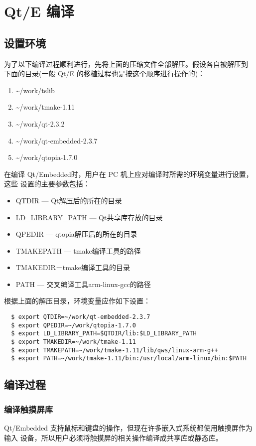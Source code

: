 \section{Qt/E 编译}
\subsection{设置环境}
为了以下编译过程顺利进行，先将上面的压缩文件全部解压。假设各自被解压到
下面的目录(一般 Qt/E 的移植过程也是按这个顺序进行操作的)：
\begin{enumerate}
    \item \textasciitilde/work/tslib
    \item \textasciitilde/work/tmake-1.11
    \item \textasciitilde/work/qt-2.3.2
    \item \textasciitilde/work/qt-embedded-2.3.7
    \item \textasciitilde/work/qtopia-1.7.0
\end{enumerate}

在编译 Qt/Embedded时，用户在 PC 机上应对编译时所需的环境变量进行设置，这些
设置的主要参数包括：
\begin{itemize}
  \item QTDIR --- Qt解压后的所在的目录
  \item LD\_LIBRARY\_PATH --- Qt共享库存放的目录
  \item QPEDIR --- qtopia解压后的所在的目录
  \item TMAKEPATH --- tmake编译工具的路径
  \item TMAKEDIR－tmake编译工具的目录
  \item PATH --- 交叉编译工具arm-linux-gcc的路径
\end{itemize}

根据上面的解压目录，环境变量应作如下设置：
\begin{verbatim}
  $ export QTDIR=~/work/qt-embedded-2.3.7
  $ export QPEDIR=~/work/qtopia-1.7.0
  $ export LD_LIBRARY_PATH=$QTDIR/lib:$LD_LIBRARY_PATH
  $ export TMAKEDIR=~/work/tmake-1.11
  $ export TMAKEPATH=~/work/tmake-1.11/lib/qws/linux-arm-g++
  $ export PATH=~/work/tmake-1.11/bin:/usr/local/arm-linux/bin:$PATH
\end{verbatim}

\subsection{编译过程}
\subsubsection{编译触摸屏库}
Qt/Embedded 支持鼠标和键盘的操作，但现在许多嵌入式系统都使用触摸屏作为输入
设备，所以用户必须将触摸屏的相关操作编译成共享库或静态库。

